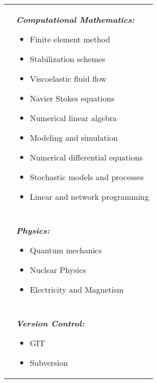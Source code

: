 \documentclass[10pt]{article}
\begin{document}
\begin{multicols}{2}
\hskip-1.0in
\begin{tabularx}{1.5\linewidth}{>{\raggedleft\scshape}p{3cm}X}
  &\textbf{\textit{Computational Mathematics:}}\begin{itemize}
  \setlength\itemsep{.005em}
  \item Finite element method
  \item Stabilization schemes
  \item Viscoelastic fluid flow
  \item Navier Stokes equations
  \item Numerical linear algebra
  \item Modeling and simulation
  \item Numerical differential equations
  \item Stochastic models and processes
  \item Linear and network programming
\end{itemize} \\
\\
  &\textbf{\textit{Physics:}}\begin{itemize}
  \setlength\itemsep{.005em}
  \item Quantum mechanics
  \item Nuclear Physics
  \item Electricity and Magnetism
  \end{itemize} \\
  \\
  &\textbf{\textit{Version Control:}}\begin{itemize}
  \setlength\itemsep{.005em}
  \item GIT
  \item Subversion
\end{itemize} 
 
\end{tabularx}
\end{multicols}
\end{document}
